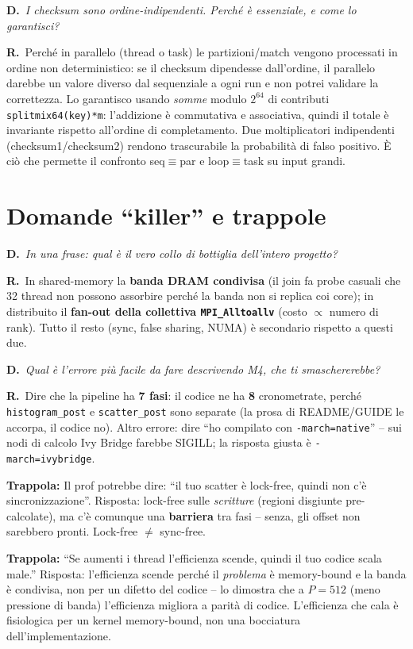 \documentclass[11pt,a4paper]{article}
\newcommand{\D}[1]{\begin{dom}\small\textbf{D.}\ \itshape #1\end{dom}}
\newcommand{\R}{\noindent\textbf{R.}\ }
\newcommand{\Trap}{\par\smallskip\noindent\textbf{\textcolor{orange!80!black}{Trappola:}} }
\begin{document}
\D{I checksum sono ordine-indipendenti. Perché è essenziale, e come lo garantisci?}
\R Perché in parallelo (thread o task) le partizioni/match vengono processati in ordine non deterministico: se il checksum dipendesse dall'ordine, il parallelo darebbe un valore diverso dal sequenziale a ogni run e non potrei validare la correttezza. Lo garantisco usando \emph{somme} modulo $2^{64}$ di contributi \texttt{splitmix64(key)*m}: l'addizione è commutativa e associativa, quindi il totale è invariante rispetto all'ordine di completamento. Due moltiplicatori indipendenti (checksum1/checksum2) rendono trascurabile la probabilità di falso positivo. È ciò che permette il confronto seq$\equiv$par e loop$\equiv$task su input grandi.

\section{Domande ``killer'' e trappole}

\D{In una frase: qual è il vero collo di bottiglia dell'intero progetto?}
\R In shared-memory la \textbf{banda DRAM condivisa} (il join fa probe casuali che 32 thread non possono assorbire perché la banda non si replica coi core); in distribuito il \textbf{fan-out della collettiva \texttt{MPI\_Alltoallv}} (costo $\propto$ numero di rank). Tutto il resto (sync, false sharing, NUMA) è secondario rispetto a questi due.

\D{Qual è l'errore più facile da fare descrivendo M4, che ti smaschererebbe?}
\R Dire che la pipeline ha \textbf{7 fasi}: il codice ne ha \textbf{8} cronometrate, perché \texttt{histogram\_post} e \texttt{scatter\_post} sono separate (la prosa di README/GUIDE le accorpa, il codice no). Altro errore: dire ``ho compilato con \texttt{-march=native}'' -- sui nodi di calcolo Ivy Bridge farebbe SIGILL; la risposta giusta è \texttt{-march=ivybridge}.

\Trap Il prof potrebbe dire: ``il tuo scatter è lock-free, quindi non c'è sincronizzazione''. Risposta: lock-free sulle \emph{scritture} (regioni disgiunte pre-calcolate), ma c'è comunque una \textbf{barriera} tra fasi -- senza, gli offset non sarebbero pronti. Lock-free $\ne$ sync-free.

\Trap ``Se aumenti i thread l'efficienza scende, quindi il tuo codice scala male.'' Risposta: l'efficienza scende perché il \emph{problema} è memory-bound e la banda è condivisa, non per un difetto del codice -- lo dimostra che a $P=512$ (meno pressione di banda) l'efficienza migliora a parità di codice. L'efficienza che cala è fisiologica per un kernel memory-bound, non una bocciatura dell'implementazione.
\end{document}

